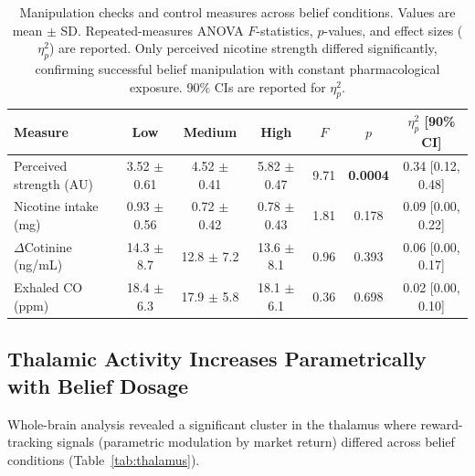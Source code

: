 \documentclass[11pt]{article}
\begin{document}
\begin{table}[H]
\centering
\caption{Manipulation checks and control measures across belief conditions. Values are mean $\pm$ SD. Repeated-measures ANOVA $F$-statistics, $p$-values, and effect sizes ($\eta_p^2$) are reported. Only perceived nicotine strength differed significantly, confirming successful belief manipulation with constant pharmacological exposure. 90\% CIs are reported for $\eta_p^2$.}
\label{tab:sanity_checks}
\begin{tabular}{lcccccc}
\toprule
\textbf{Measure} & \textbf{Low} & \textbf{Medium} & \textbf{High} & \textbf{$F$} & \textbf{$p$} & \textbf{$\eta_p^2$ [90\% CI]} \\
\midrule
Perceived strength (AU) & 3.52 $\pm$ 0.61 & 4.52 $\pm$ 0.41 & 5.82 $\pm$ 0.47 & 9.71 & \textbf{0.0004} & 0.34 [0.12, 0.48] \\
Nicotine intake (mg) & 0.93 $\pm$ 0.56 & 0.72 $\pm$ 0.42 & 0.78 $\pm$ 0.43 & 1.81 & 0.178 & 0.09 [0.00, 0.22] \\
$\Delta$Cotinine (ng/mL) & 14.3 $\pm$ 8.7 & 12.8 $\pm$ 7.2 & 13.6 $\pm$ 8.1 & 0.96 & 0.393 & 0.06 [0.00, 0.17] \\
Exhaled CO (ppm) & 18.4 $\pm$ 6.3 & 17.9 $\pm$ 5.8 & 18.1 $\pm$ 6.1 & 0.36 & 0.698 & 0.02 [0.00, 0.10] \\
\bottomrule
\end{tabular}
\end{table}

\subsection{Thalamic Activity Increases Parametrically with Belief Dosage}

Whole-brain analysis revealed a significant cluster in the thalamus where reward-tracking signals (parametric modulation by market return) differed across belief conditions (Table~\ref{tab:thalamus}).
\end{document}
